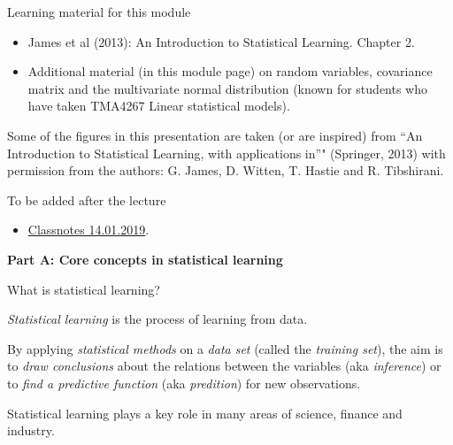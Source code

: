 \documentclass[ignorenonframetext,]{beamer}
\providecommand{\tightlist}{%
  \setlength{\itemsep}{0pt}\setlength{\parskip}{0pt}}
\begin{document}
\begin{frame}

\begin{block}{Learning material for this module}

\begin{itemize}
\tightlist
\item
  James et al (2013): An Introduction to Statistical Learning. Chapter
  2.\\
\item
  Additional material (in this module page) on random variables,
  covariance matrix and the multivariate normal distribution (known for
  students who have taken TMA4267 Linear statistical models).
\end{itemize}

Some of the figures in this presentation are taken (or are inspired)
from ``An Introduction to Statistical Learning, with applications in''"
(Springer, 2013) with permission from the authors: G. James, D. Witten,
T. Hastie and R. Tibshirani.

\end{block}

\begin{block}{To be added after the lecture}

\begin{itemize}
\tightlist
\item
  \href{https://www.math.ntnu.no/emner/TMA4268/2019v/notes/M2L1notes.pdf}{Classnotes
  14.01.2019}.
\end{itemize}

\large

\textbf{Part A: Core concepts in statistical learning}

\normalsize

\end{block}

\end{frame}

\begin{frame}{What is statistical learning?}

\emph{Statistical learning} is the process of learning from data.

By applying \emph{statistical methods} on a \emph{data set} (called the
\emph{training set}), the aim is to \emph{draw conclusions} about the
relations between the variables (aka \emph{inference}) or to \emph{find
a predictive function} (aka \emph{predition}) for new observations.

Statistical learning plays a key role in many areas of science, finance
and industry.

\end{frame}
\end{document}
